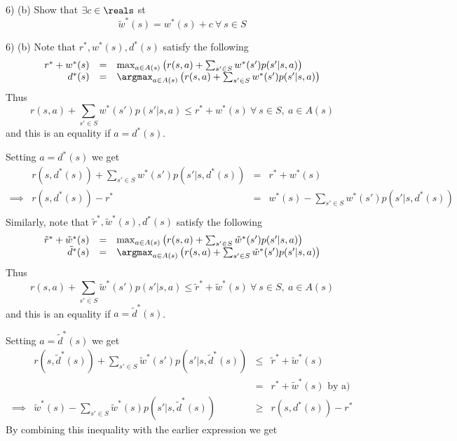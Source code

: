 \documentclass[11pt,a4paper]{article}
\begin{document}
\begin{question}{6) (b)}
  Show that $\exists c\in \reals$ st
  \[ \tilde{w}^*(s)=w^*(s)+c\ \forall\ s\in S \]
\end{question}

\begin{answer}{6) (b)}
  Note that $r^*,w^*(s),d^*(s)$ satisfy the following
  \[\begin{array}{rcl}
    r^*+w^*(s)&=&\max_{a\in A(s)}\left(r(s,a)+\sum_{s'\in S}w^*(s')p(s'|s,a)\right)\\
    d^*(s)&=&\argmax_{a\in A(s)}\left(r(s,a)+\sum_{s'\in S}w^*(s')p(s'|s,a)\right)\\
  \end{array}\]
  Thus
  \[ r(s,a)+\sum_{s'\in S}w^*(s')p(s'|s,a)\leq r^*+w^*(s)\ \forall\ s\in S,\ a\in A(s) \]
  and this is an equality if $a=d^*(s)$.
  \par Setting $a=d^*(s)$ we get
  \[\begin{array}{rrcl}
    &r(s,d^*(s))+\sum_{s'\in S}w^*(s')p(s'|s,d^*(s))&=&r^*+w^*(s)\\
    \implies&r(s,d^*(s))-r^*&=&w^*(s)-\sum_{s'\in S}w^*(s')p(s'|s,d^*(s))\\
  \end{array}\]
  Similarly, note that $\tilde{r}^*,\tilde{w}^*(s),d^*(s)$ satisfy the following
  \[\begin{array}{rcl}
    \tilde{r}^*+\tilde{w}^*(s)&=&\max_{a\in A(s)}\left(r(s,a)+\sum_{s'\in S}\tilde{w}^*(s')p(s'|s,a)\right)\\
    \tilde{d}^*(s)&=&\argmax_{a\in A(s)}\left(r(s,a)+\sum_{s'\in S}\tilde{w}^*(s')p(s'|s,a)\right)\\
  \end{array}\]
  Thus
  \[ r(s,a)+\sum_{s'\in S}\tilde{w}^*(s')p(s'|s,a)\leq \tilde{r}^*+\tilde{w}^*(s)\ \forall\ s\in S,\ a\in A(s) \]
  and this is an equality if $a=\tilde{d}^*(s)$.
  \par Setting $a=\tilde{d}^*(s)$ we get
  \[\begin{array}{rrcl}
    &r(s,\tilde{d}^*(s))+\sum_{s'\in S}\tilde{w}^*(s')p(s'|s,\tilde{d}^*(s))&\leq&\tilde{r}^*+\tilde{w}^*(s)\\
    &&=&r^*+\tilde{w}^*(s)\text{ by a)}\\
    \implies&\tilde{w}^*(s)-\sum_{s'\in S}\tilde{w}^*(s)p(s'|s,\tilde{d}^*(s))&\geq&r(s,d^*(s))-r^*
  \end{array}\]
  By combining this inequality with the earlier expression we get
  \begin{equation}

\end{equation}
\end{answer}
\end{document}
